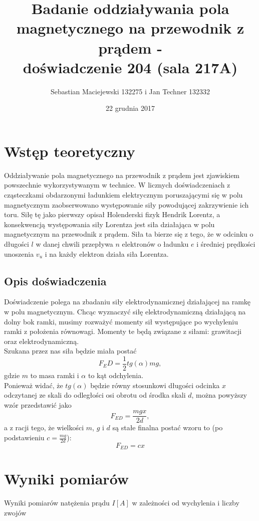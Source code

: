 \documentclass[10pt,a4paper]{article}
\author{Sebastian Maciejewski 132275 i Jan Techner 132332}
\title{Badanie oddziaływania pola magnetycznego na przewodnik z prądem - \\ doświadczenie 204 (sala 217A)}
\date{22 grudnia 2017}
\newcommand{\forceindent}{\leavevmode{\parindent=3em\indent}}
\begin{document}
\maketitle
\section{Wstęp teoretyczny}
\forceindent Oddziaływanie pola magnetycznego na przewodnik z prądem jest zjawiskiem powszechnie wykorzystywanym w technice. W licznych doświadczeniach z cząsteczkami obdarzonymi ładunkiem elektrycznym poruszającymi się w polu magnetycznym zaobserwowano występowanie siły powodującej zakrzywienie ich toru. Siłę tę jako pierwszy opisał Holenderski fizyk Hendrik Lorentz, a konsekwencją występowania siły Lorentza jest siła działająca w polu magnetycznym na przewodnik z prądem. Siła ta bierze się z tego, że w odcinku o długości $l$ w danej chwili przepływa $n$ elektronów o ładunku $e$ i średniej prędkości unoszenia $v_u$ i na każdy elektron działa siła Lorentza.

\subsection*{Opis doświadczenia}
\forceindent Doświadczenie polega na zbadaniu siły elektrodynamicznej działającej na ramkę w polu magnetycznym. Chcąc wyznaczyć siłę elektrodynamiczną działającą na dolny bok ramki, musimy rozważyć momenty sił występujące po wychyleniu ramki z położenia równowagi. Momenty te będą związane z siłami: grawitacji oraz elektrodynamiczną. \\
Szukana przez nas siła będzie miała postać $$F_ED = \frac{1}{2} tg(\alpha)mg,$$ gdzie $m$ to masa ramki i $\alpha$ to kąt odchylenia.\\
Ponieważ widać, że $tg(\alpha)$ będzie równy stosunkowi długości odcinka $x$ odczytanej ze skali do odległości osi obrotu od środka skali $d$, można powyższy wzór przedstawić jako
$$ F_{ED} = \frac{mgx}{2d}, $$ a z racji tego, że wielkości $m$, $g$ i $d$ są stałe finalna postać wzoru to (po podstawieniu $c=\frac{mg}{2d}$):
$$ F_{ED} = cx $$


\newpage
\section{Wyniki pomiarów}

Wyniki pomiarów natężenia prądu $I[A]$ w zależności od wychylenia i liczby zwojów\\
\end{document}

